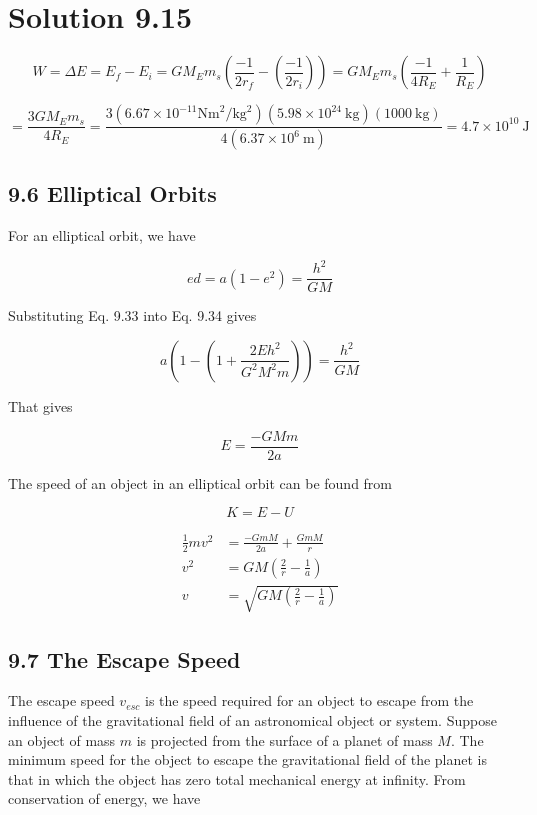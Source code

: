 \documentclass[10pt]{article}
\begin{document}
\section*{Solution 9.15}
$$
W=\Delta E=E_{f}-E_{i}=G M_{E} m_{s}\left(\frac{-1}{2 r_{f}}-\left(\frac{-1}{2 r_{i}}\right)\right)=G M_{E} m_{s}\left(\frac{-1}{4 R_{E}}+\frac{1}{R_{E}}\right)
$$

$$
=\frac{3 G M_{E} m_{s}}{4 R_{E}}=\frac{3\left(6.67 \times 10^{-11} \mathrm{Nm}^{2} / \mathrm{kg}^{2}\right)\left(5.98 \times 10^{24} \mathrm{~kg}\right)(1000 \mathrm{~kg})}{4\left(6.37 \times 10^{6} \mathrm{~m}\right)}=4.7 \times 10^{10} \mathrm{~J}
$$

\subsection*{9.6 Elliptical Orbits}
For an elliptical orbit, we have


\begin{equation*}
e d=a\left(1-e^{2}\right)=\frac{h^{2}}{G M} \tag{9.34}
\end{equation*}


Substituting Eq. 9.33 into Eq. 9.34 gives

$$
a\left(1-\left(1+\frac{2 E h^{2}}{G^{2} M^{2} m}\right)\right)=\frac{h^{2}}{G M}
$$

That gives

$$
E=\frac{-G M m}{2 a}
$$

The speed of an object in an elliptical orbit can be found from

$$
K=E-U
$$

$$
\begin{aligned}
\frac{1}{2} m v^{2} & =\frac{-G m M}{2 a}+\frac{G m M}{r} \\
v^{2} & =G M\left(\frac{2}{r}-\frac{1}{a}\right) \\
v & =\sqrt{G M\left(\frac{2}{r}-\frac{1}{a}\right)}
\end{aligned}
$$

\subsection*{9.7 The Escape Speed}
The escape speed $v_{e s c}$ is the speed required for an object to escape from the influence of the gravitational field of an astronomical object or system. Suppose an object of mass $m$ is projected from the surface of a planet of mass $M$. The minimum speed for the object to escape the gravitational field of the planet is that in which the object has zero total mechanical energy at infinity. From conservation of energy, we have
\end{document}
